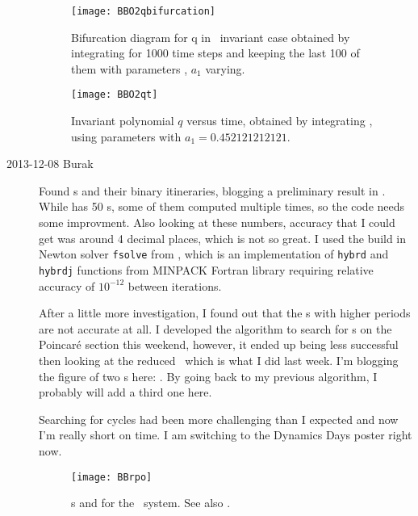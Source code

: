\begin{description}
\begin{figure}%
  \begin{center}
  \texttt{[image: BBO2qbifurcation]}
  \end{center}
  \caption{
Bifurcation diagram for q in \ invariant case obtained by integrating
 for 1000 time steps and keeping the last 100 of them with parameters ,
$a_1$ varying.
    }
  \label{fig:BBO2qbifurcation}
\end{figure}

\begin{figure}%
  \begin{center}
  \texttt{[image: BBO2qt]}
  \end{center}
  \caption{
Invariant polynomial $q$ versus time, obtained by integrating ,
using parameters  with $a_1 = 0.452121212121$.
    }
  \label{fig:BBO2qt}
\end{figure}

\item[2013-12-08 Burak] Found \rpo s and their binary itineraries, blogging
a preliminary result in . While  has 50 \rpo s,
some of them computed multiple times, so the code needs some improvment.
Also looking at these numbers, accuracy that I could get was around 4 decimal
places, which is not so great. I used the build in Newton solver \texttt{fsolve}
from  , which is an implementation of
\texttt{hybrd} and \texttt{hybrdj} functions from 
{MINPACK Fortran library} requiring relative accuracy of $10^{-12}$ between iterations.

After a little more investigation, I found out that the \rpo s with higher periods
are not accurate at all. I developed the algorithm to search for \rpo s on the
Poincar\'e section this weekend, however, it ended up being less successful then
looking at the reduced \statesp\ which is what I did last week. I'm blogging
the figure of two \rpo s here: . By going back to my
previous algorithm, I probably will add a third one here.

Searching for cycles had been more challenging than I expected and now I'm really
short on time. I am switching to the Dynamics Days poster right now.

\begin{figure}%
  \begin{center}
  \texttt{[image: BBrpo]}
  \end{center}
  \caption{
	\Rpo s  and  for  the \twoMode\ system.
    See also .
    }
  \label{fig:BBrpo}
\end{figure}


\end{description}
